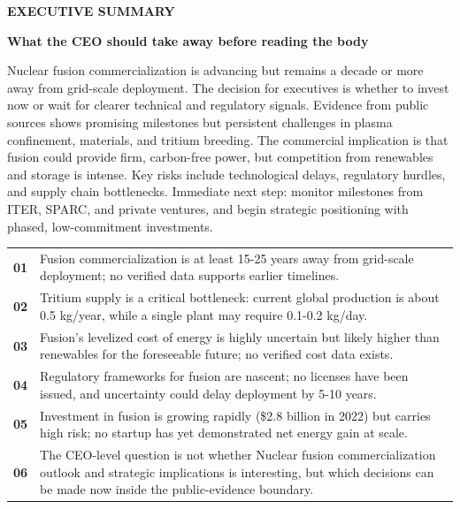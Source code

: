 \documentclass[10pt,a4paper]{article}
\begin{document}
\clearpage
{\textcolor{BOBlue}{\scriptsize\bfseries EXECUTIVE SUMMARY}}\par\vspace{-1pt}
{\Large\sffamily\bfseries\color{BONavy} What the CEO should take away before reading the body}\par\vspace{4pt}
\vspace{2pt}{\color{BOBright}\rule{\linewidth}{1pt}}\vspace{5pt}
{\normalsize\color{BONavy} Nuclear fusion commercialization is advancing but remains a decade or more away from grid-scale deployment. The decision for executives is whether to invest now or wait for clearer technical and regulatory signals. Evidence from public sources shows promising milestones but persistent challenges in plasma confinement, materials, and tritium breeding. The commercial implication is that fusion could provide firm, carbon-free power, but competition from renewables and storage is intense. Key risks include technological delays, regulatory hurdles, and supply chain bottlenecks. Immediate next step: monitor milestones from ITER, SPARC, and private ventures, and begin strategic positioning with phased, low-commitment investments.}\par\vspace{6pt}
\begin{tabularx}{\linewidth}{p{12mm}Y}
\textcolor{BOBlue}{\bfseries 01} & {\footnotesize Fusion commercialization is at least 15-25 years away from grid-scale deployment; no verified data supports earlier timelines.} \\[5pt]
\textcolor{BOBlue}{\bfseries 02} & {\footnotesize Tritium supply is a critical bottleneck: current global production is about 0.5 kg/year, while a single plant may require 0.1-0.2 kg/day.} \\[5pt]
\textcolor{BOBlue}{\bfseries 03} & {\footnotesize Fusion's levelized cost of energy is highly uncertain but likely higher than renewables for the foreseeable future; no verified cost data exists.} \\[5pt]
\textcolor{BOBlue}{\bfseries 04} & {\footnotesize Regulatory frameworks for fusion are nascent; no licenses have been issued, and uncertainty could delay deployment by 5-10 years.} \\[5pt]
\textcolor{BOBlue}{\bfseries 05} & {\footnotesize Investment in fusion is growing rapidly (\$2.8 billion in 2022) but carries high risk; no startup has yet demonstrated net energy gain at scale.} \\[5pt]
\textcolor{BOBlue}{\bfseries 06} & {\footnotesize The CEO-level question is not whether Nuclear fusion commercialization outlook and strategic implications is interesting, but which decisions can be made now inside the public-evidence boundary.} \\[5pt]
\end{tabularx}
\end{document}
